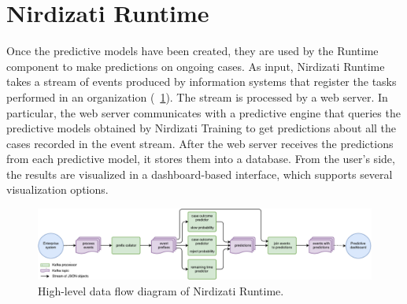 \documentclass[runningheads,a4paper]{llncs}
\begin{document}



\section{Nirdizati Runtime} \label{sec:runtime}
Once the predictive models have been created, they are used by the Runtime component to make predictions on ongoing cases. As input, Nirdizati Runtime takes a stream of events produced by information systems that register the tasks performed in an organization (\figurename~\ref{fig:dfd_0}). The stream is processed by a web server.
In particular, the web server communicates with a predictive engine that queries the predictive models obtained by Nirdizati Training to get predictions about all the cases recorded in the event stream.
After the web server receives the predictions from each predictive model, it stores them into a database.
From the user's side, the results are visualized in a dashboard-based interface, which supports several visualization options.

\begin{figure}[t]
	\centering
	\includegraphics[width=\textwidth]{img/nirdizati-dataflow}
	\caption{High-level data flow diagram of Nirdizati Runtime.}
	\label{fig:dfd_0}
\end{figure}
\end{document}
